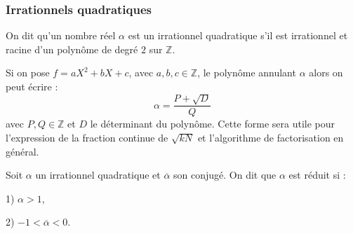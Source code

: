 \documentclass[a4paper]{article} %
\numberwithin{equation}{section}
\begin{document}
\subsubsection{Irrationnels quadratiques}
\begin{defn}
On dit qu'un nombre réel $\alpha$ est un irrationnel quadratique s'il est irrationnel et racine d'un polynôme de degré $2$ sur $\mathbb{Z}$.
\end{defn}
\begin{rem}
Si on pose $f = aX^2 + bX + c$, avec $a, b, c \in\mathbb{Z}$, le polynôme annulant $\alpha$ alors on peut écrire :
\begin{equation}
\label{eqIrra}
\alpha = \dfrac{{P} + \sqrt{D}}{Q}
\end{equation}
avec $P,Q\in\mathbb{Z}$ et $D$ le déterminant du polynôme. Cette forme sera utile pour l'expression de la fraction continue de $\sqrt{kN}$ et l'algorithme de factorisation en général.
\end{rem}
\begin{defn}
Soit $\alpha$ un irrationnel quadratique et $\overline{\alpha}$ son conjugé. On dit que $\alpha$ est réduit si :
\item 1) $\alpha > 1$,
\item 2) $-1 < \overline{\alpha} < 0$.
\end{defn}
\end{document}
